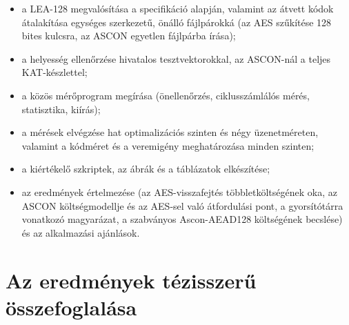 \documentclass[a4paper,12pt]{report}
\theoremstyle{definition}
\theoremstyle{remark}
\begin{document}
\begin{itemize}
	\item a LEA-128 megvalósítása a specifikáció alapján, valamint az átvett kódok átalakítása egységes szerkezetű, önálló fájlpárokká (az AES szűkítése 128 bites kulcsra, az ASCON egyetlen fájlpárba írása);
	\item a helyesség ellenőrzése hivatalos tesztvektorokkal, az ASCON-nál a teljes KAT-készlettel;
	\item a közös mérőprogram megírása (önellenőrzés, ciklusszámlálós mérés, statisztika, kiírás);
	\item a mérések elvégzése hat optimalizációs szinten és négy üzenetméreten, valamint a kódméret és a veremigény meghatározása minden szinten;
	\item a kiértékelő szkriptek, az ábrák és a táblázatok elkészítése;
	\item az eredmények értelmezése (az AES-visszafejtés többletköltségének oka, az ASCON költségmodellje és az AES-sel való átfordulási pont, a gyorsítótárra vonatkozó magyarázat, a szabványos Ascon-AEAD128 költségének becslése) és az alkalmazási ajánlások.
\end{itemize}

\section{Az eredmények tézisszerű összefoglalása}
\end{document}

